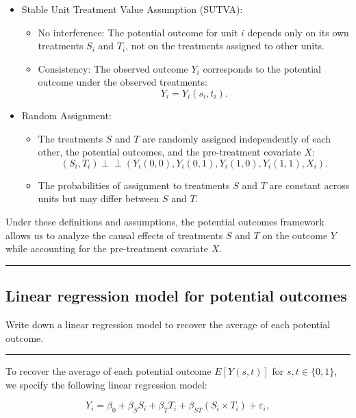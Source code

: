 \documentclass{article}
\newenvironment{colorparagraph}[1]{\par\color{#1}}{\par}
\begin{document}
\begin{itemize}
  \item Stable Unit Treatment Value Assumption (SUTVA):
  \begin{itemize}
    \item No interference: The potential outcome for unit \(i\) depends only on its own treatments \(S_i\) and \(T_i\), not on the treatments assigned to other units.
    \item Consistency: The observed outcome \(Y_i\) corresponds to the potential outcome under the observed treatments:
    \[
    Y_i = Y_i(s_i, t_i).
    \]
  \end{itemize}
  \item Random Assignment:
  \begin{itemize}
    \item The treatments \(S\) and \(T\) are randomly assigned independently of each other, the potential outcomes, and the pre-treatment covariate \(X\):
    \[
    (S_i, T_i) \perp \!\!\! \perp \left( Y_i(0,0), Y_i(0,1), Y_i(1,0), Y_i(1,1), X_i \right).
    \]
    \item The probabilities of assignment to treatments \(S\) and \(T\) are constant across units but may differ between \(S\) and \(T\).
  \end{itemize}
\end{itemize}

Under these definitions and assumptions, the potential outcomes framework allows us to analyze the causal effects of treatments \(S\) and \(T\) on the outcome \(Y\) while accounting for the pre-treatment covariate \(X\).

\begin{colorparagraph}{questioncolor}
\rule{\textwidth}{0.5pt}

\label{q3b}\subsection{Linear regression model for potential outcomes}
Write down a linear regression model to recover the average of each potential outcome.

\rule{\textwidth}{0.5pt}
\end{colorparagraph}

To recover the average of each potential outcome \(E[Y(s, t)]\) for \(s, t \in \{0,1\}\), we specify the following linear regression model:

\[
Y_i = \beta_0 + \beta_S S_i + \beta_T T_i + \beta_{ST} (S_i \times T_i) + \varepsilon_i,
\]
\end{document}
